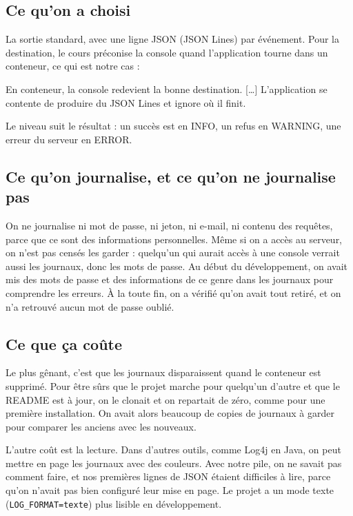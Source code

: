 \documentclass[11pt,a4paper]{article}
\begin{document}
\subsection*{Ce qu'on a choisi}

La sortie standard, avec une ligne JSON (JSON Lines) par événement. Pour la destination, le cours préconise la console quand l'application tourne dans un conteneur, ce qui est notre cas :
\begin{extrait}
\og En conteneur, la console redevient la bonne destination. [\ldots] L'application se contente de produire du JSON Lines et ignore où il finit. \fg{}
\end{extrait}
Le niveau suit le résultat : un succès est en INFO, un refus en WARNING, une erreur du serveur en ERROR.

\subsection*{Ce qu'on journalise, et ce qu'on ne journalise pas}

On ne journalise ni mot de passe, ni jeton, ni e-mail, ni contenu des requêtes, parce que ce sont des informations personnelles. Même si on a accès au serveur, on n'est pas censés les garder : quelqu'un qui aurait accès à une console verrait aussi les journaux, donc les mots de passe. Au début du développement, on avait mis des mots de passe et des informations de ce genre dans les journaux pour comprendre les erreurs. À la toute fin, on a vérifié qu'on avait tout retiré, et on n'a retrouvé aucun mot de passe oublié.

\subsection*{Ce que ça coûte}

Le plus gênant, c'est que les journaux disparaissent quand le conteneur est supprimé. Pour être sûrs que le projet marche pour quelqu'un d'autre et que le README est à jour, on le clonait et on repartait de zéro, comme pour une première installation. On avait alors beaucoup de copies de journaux à garder pour comparer les anciens avec les nouveaux.

L'autre coût est la lecture. Dans d'autres outils, comme Log4j en Java, on peut mettre en page les journaux avec des couleurs. Avec notre pile, on ne savait pas comment faire, et nos premières lignes de JSON étaient difficiles à lire, parce qu'on n'avait pas bien configuré leur mise en page. Le projet a un mode texte (\texttt{LOG\_FORMAT=texte}) plus lisible en développement.
\end{document}
